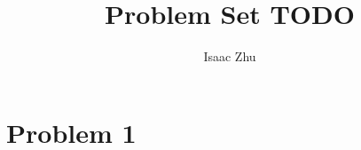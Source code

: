 \documentclass{article}
\begin{document}
\title{Problem Set TODO}
\author{Isaac Zhu}

\maketitle

\section*{Problem 1}
\end{document}
